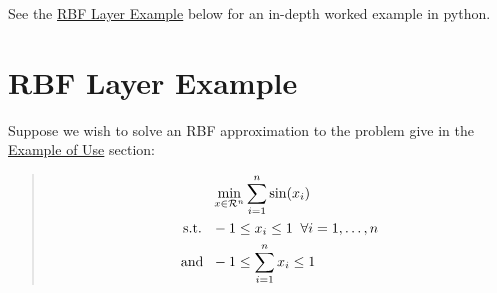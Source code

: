 \documentclass[letterpaper,11pt,openany,oneside]{sphinxmanual}
\begin{document}
See the {\hyperref[userguide:rbf-layer-example]{RBF Layer Example}} below for an in-depth worked example in python.


\section{RBF Layer Example}
\label{userguide:rbf-layer-example}
Suppose we wish to solve an RBF approximation to the problem give in the {\hyperref[userguide:example-of-use]{Example of Use}} section:
\begin{quote}
\begin{gather}
\begin{split}&\min_{x \in \mathcal{R}^n} \sum_{i=1}^n \sin(x_i) \\
\text{s.t. } \; &-1 \le x_i \le 1 \; \; \forall i=1,\dotsc,n \\
\text{and }  \; &-1 \le \sum_{i=1}^nx_i \le 1\end{split}\notag
\end{gather}\end{quote}
\end{document}
